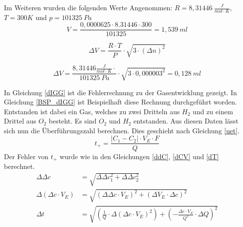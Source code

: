 Im Weiteren wurden die folgenden Werte Angenommen: $R=8,31446\ \frac{J}{mol\cdot K}$, $T=300K$ und $p=101325\ Pa$
\begin{equation}
V=\frac{0,0000625 \cdot 8.31446 \cdot 300}{101325}=1,539\ ml
\label{BSP_IGG}
\end{equation}

\begin{equation}
\Delta V=\frac{R\cdot T}{P}\cdot \sqrt{3\cdot(\Delta n)^2}
\label{dIGG}
\end{equation}

\begin{equation}
\Delta V=\frac{8,31446\frac{J}{mol\cdot K}\cdot }{101325\ Pa}\cdot \sqrt{3\cdot 0,000003^2} =0,128\ ml
\label{BSP_dIGG}
\end{equation}

In Gleichung \ref{dIGG} ist die Fehlerrechnung zu der Gasentwicklung gezeigt. In Gleichung \ref{BSP_dIGG} ist Beispielhaft diese Rechnung durchgeführt worden.
Entstanden ist dabei ein Gas, welches zu zwei Dritteln aus $H_2$ und zu einem Drittel aus $O_2$ besteht.
Es sind \VOzwei $O_2$ und \VHzwei $H_2$ entstanden.
Aus diesen Daten lässt sich nun die Überführungszahl berechnen. Dies geschieht nach Gleichung \ref{uet}.
\begin{equation}
t_+ =\frac{\left|C_1-C_2\right|\cdot V_E\cdot F}{Q}
\label{uet}
\end{equation}
Der Fehler von $t_+$ wurde wie in den Gleichungen \ref{ddC}, \ref{dCV} und \ref{dT} berechnet.
\begin{align}
\Delta\Delta c&= \sqrt{\Delta\Delta c_1^2 + \Delta\Delta c_2^2} \label{ddC}\\
\Delta(\Delta c\cdot V_E) &= \sqrt{ (\Delta\Delta c\cdot V_E )^2 + (\Delta V_E\cdot \Delta c)^2} \label{dCV}\\
\Delta t &= \sqrt{ \left(\frac{1}{Q}\cdot\Delta(\Delta c\cdot V_E)^2\right)+\left(-\frac{\Delta c\cdot V_E}{Q^2}\cdot\Delta Q\right)^2} \label{dT}\\
\end{align}

